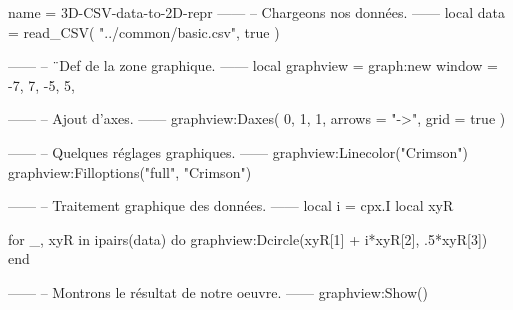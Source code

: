\documentclass{standalone}
\begin{document}
\begin{luadraw}{name = 3D-CSV-data-to-2D-repr}
------
-- Chargeons nos données.
------
local data = read_CSV(
  "../common/basic.csv",
  true
)

------
-- ¨Def de la zone graphique.
------
local graphview = graph:new{
  window = {-7, 7, -5, 5},
}

------
-- Ajout d'axes.
------
graphview:Daxes(
  {0, 1, 1},
  {
    arrows = "->",
    grid   = true
  }
)

------
-- Quelques réglages graphiques.
------
graphview:Linecolor("Crimson")
graphview:Filloptions("full", "Crimson")

------
-- Traitement graphique des données.
------
local i = cpx.I
local xyR

for _, xyR in ipairs(data) do
  graphview:Dcircle(xyR[1] + i*xyR[2], .5*xyR[3])
end

------
-- Montrons le résultat de notre oeuvre.
------
graphview:Show()
\end{luadraw}
\end{document}
